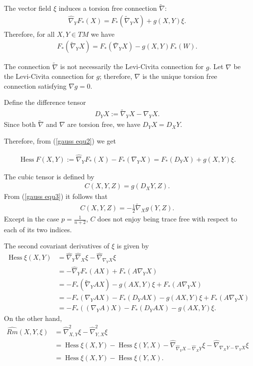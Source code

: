 \documentclass{amsart}
\theoremstyle{definition}
\theoremstyle{remark}
\numberwithin{equation}{section}
\begin{document}
The vector field $\xi$ induces a torsion free connection $\tilde{\nabla}$:
\begin{align}\label{gauss equ2}
\hat{\nabla}_YF_{\ast}(X)=F_{\ast}(\tilde{\nabla}_YX)+g(X,Y)\xi.
\end{align}
Therefore, for all $X,Y\in TM$ we have
\begin{align}
F_{\ast}(\tilde{\nabla}_Y X)=F_{\ast}(\bar{\nabla}_YX)-g(X,Y)F_{\ast}(W).
\end{align}

The connection $\tilde{\nabla}$ is not necessarily the Levi-Civita connection for $g$. Let $\nabla$ be the Levi-Civita connection for $g$; therefore, $\nabla$ is the unique torsion free connection satisfying $\nabla g=0.$

Define the difference tensor
\begin{align*}
D_YX:=\tilde{\nabla}_{Y}X-\nabla_{Y}X.
\end{align*}
Since both $\tilde{\nabla}$ and $\nabla$ are torsion free, we have $D_YX=D_XY.$

Therefore, from (\ref{gauss equ2}) we get

\begin{align}\label{gauss equ3}
\operatorname{Hess}F(X,Y):=\hat{\nabla}_YF_{\ast}(X)-F_{\ast}(\nabla_YX)=F_{\ast}(D_YX)+g(X,Y)\xi.
\end{align}

The cubic tensor is defined by
\begin{align}
C(X,Y,Z)=g(D_XY,Z).
\end{align}
From (\ref{gauss equ3}) it follows that
\begin{align}
C(X,Y,Z)
=-\frac{1}{2}\tilde{\nabla}_Xg(Y,Z).
\end{align}
Except in the case $ p =\frac{1}{n+2}$, $ C$ does not enjoy being trace free with respect to each of its two indices.


The second covariant derivatives of $ \xi$ is given by
\begin{align}
\operatorname{Hess}\xi(X,Y)&=\hat{\nabla}_Y\hat{\nabla}_X\xi-\hat{\nabla}_{\nabla_YX}\xi\\
&=-\hat{\nabla}_YF_{\ast}(AX)+F_{\ast}(A\nabla_YX)\nonumber\\
&=-F_{\ast}(\tilde{\nabla}_{Y}AX)-g(A X,Y)\xi+F_{\ast}(A\nabla_YX)\nonumber\\
&=-F_{\ast}(\nabla_{Y}AX)-F_{\ast}(D_{Y}AX)-g(A X,Y)\xi+F_{\ast}(A\nabla_YX)\nonumber\\
&=-F_{\ast}((\nabla_Y A)X)-F_{\ast}(D_{Y}AX)-g(A X,Y)\xi.\nonumber
\end{align}
On the other hand,
\begin{align}
\widehat{Rm}(X,Y,\xi)&=\hat{\nabla}^2_{X,Y}\xi-\hat{\nabla}^2_{Y,X}\xi\\
&=\operatorname{Hess}\xi(X,Y)-\operatorname{Hess}\xi(Y,X)-\hat{\nabla}_{\hat{\nabla}_YX-\hat{\nabla}_XY}\xi-\hat{\nabla}_{\nabla_XY-\nabla_YX}\xi\nonumber\\
&=\operatorname{Hess}\xi(X,Y)-\operatorname{Hess}\xi(Y,X).\nonumber
\end{align}
\end{document}
